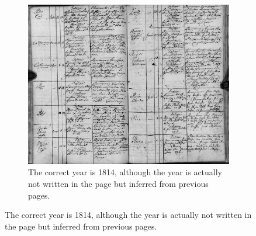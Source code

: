 
\begin{figure}
    \centering
    \begin{subfigure}[c]{1.0\textwidth}
        \centering    \includegraphics[scale=0.29]{resources/SWE_attention/S3HY-DRC3-H5L.jpg}
        \caption{The correct year is 1814, although the year is actually not written in the page but inferred from previous pages.}
    \end{subfigure}

    \vspace{1em}


\end{figure}
